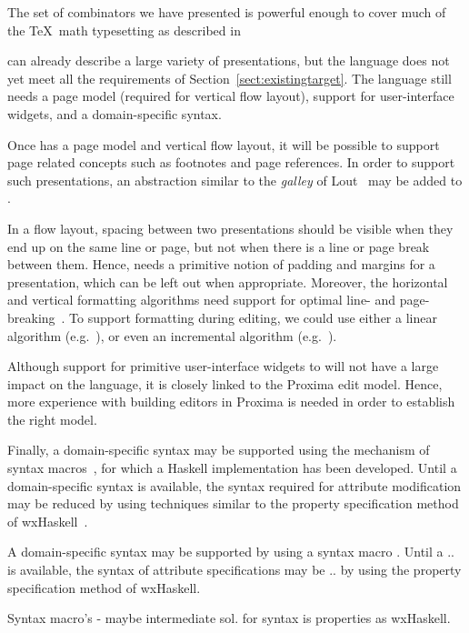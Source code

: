 \bc The set of combinators we have presented is powerful enough to cover much of the \TeX~math typesetting as described in \cite{heckmann97functionalTex} \ec

{\Xprez} can already describe a large variety of presentations, but the language does not yet meet all the requirements of  Section~\ref{sect:existingtarget}. The language still needs a page model (required for vertical flow layout), support for user-interface widgets, and a domain-specific syntax.

Once {\Xprez} has a page model and vertical flow layout, it will be possible to support page related concepts such as footnotes and page references. In order to support such presentations, an abstraction similar to the {\em galley} of Lout~\cite{kingston93lout} may be added to {\Xprez}.

In a flow layout, spacing between two presentations should be visible when they end up on the same line or page, but not when there is a line or page break between them. Hence, {\Xprez} needs a primitive notion of padding and margins for a presentation, which can be left out when appropriate. Moreover, the horizontal and vertical formatting algorithms need support for optimal line- and page-breaking~\cite{knuth82breaking}. To support formatting during editing, we could use either a linear algorithm (e.g.\ \cite{demoor99breaking}), or even an incremental algorithm (e.g.\ \cite{jeuring91breaking}).

Although support for primitive user-interface widgets to {\Xprez} will not have a large impact on the language, it is closely linked to the Proxima edit model. Hence, more experience with building editors in Proxima is needed in order to establish the right model.

Finally, a domain-specific syntax may be supported using the mechanism of syntax macros~\cite{leavenworth66synMacros}, for which a Haskell implementation has been developed. Until a domain-specific syntax is available, the syntax required for attribute modification may be reduced by using techniques similar to the property specification method of wxHaskell~\cite{leijen04wxHaskell}.

\bc A domain-specific syntax may be supported by using a syntax macro . Until a .. is available, the syntax of attribute specifications may be .. by using the property specification method of wxHaskell.
\ec

\bc
\cite{leijen04wxHaskell}
Syntax macro's - maybe intermediate sol. for syntax is properties as wxHaskell.
\ec


